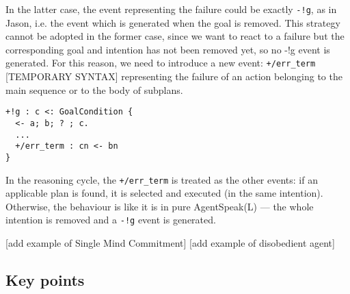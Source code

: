 \noindent In the latter case, the event representing the failure could
be exactly \texttt{-!g}, as in Jason, i.e. the event which is
generated when the goal is removed.
%
This strategy cannot be adopted in the former case, since we want to
react to a failure but the corresponding goal and intention has not
been removed yet, so no -!g event is generated. For this reason, we
need to introduce a new event: \texttt{+/err\_term} [TEMPORARY SYNTAX]
representing the failure of an action belonging to the main sequence
or to the body of subplans.

{\small
\begin{verbatim}
+!g : c <: GoalCondition {
  <- a; b; ? ; c. 
  ...
  +/err_term : cn <- bn
}
\end{verbatim}}

  \noindent In the reasoning cycle, the \texttt{+/err\_term} is
  treated as the other events: if an applicable plan is found, it is
  selected and executed (in the same intention).
%
  Otherwise, the behaviour is like it is in pure AgentSpeak(L) --- the
  whole intention is removed and a \texttt{-!g} event is generated.

[add example of Single Mind Commitment]
[add example of disobedient agent]

%
%
\subsection{Key points}

